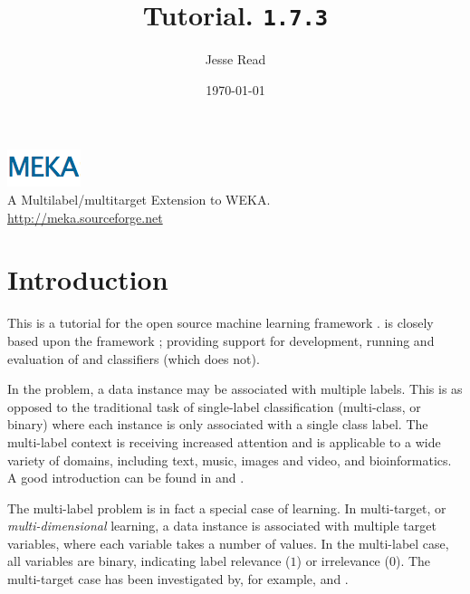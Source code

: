 \documentclass[11pt]{article}
\newcommand{\MEKA}{Meka}
\newcommand{\WEKA}{Weka}
\def\version{{\tt 1.7.3}}
\begin{document}
\title{Tutorial. \framework{\MEKA} \version }

\author{Jesse Read}

\date{\mydate\today}

\maketitle

\begin{center}
	\includegraphics{MEKA.png}\\
		A Multilabel/multitarget Extension to WEKA.\\
		\url{http://meka.sourceforge.net}
\end{center}

\tableofcontents

\pagestyle{empty}
\pagebreak

\section{Introduction}

This is a tutorial for the open source machine learning framework \framework{\MEKA}. \framework{\MEKA} is closely based upon the \framework{\WEKA} framework \cite{WEKA}; providing support for development, running and evaluation of  and  classifiers (which  does not).

In the  problem, a data instance may be associated with multiple labels. This is as opposed to the traditional task of single-label classification (\ie multi-class, or binary) where each instance is only associated with a single class label. The multi-label context is receiving increased attention and is applicable to a wide variety of domains, including text, music, images and video, and bioinformatics. A good introduction can be found in \cite{MMD} and \cite{Thesis}.

The multi-label problem is in fact a special case of  learning. In multi-target, or \textit{multi-dimensional} learning, a data instance is associated with multiple target variables, where each variable takes a number of values. In the multi-label case, all variables are binary, indicating label relevance ($1$) or irrelevance ($0$). The multi-target case has been investigated by, for example, \cite{UPM} and \cite{MT}.  
\end{document}
